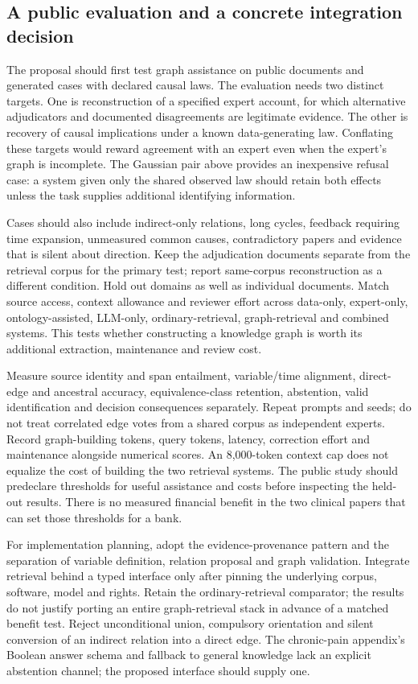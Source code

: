 \subsection{A public evaluation and a concrete integration decision}
\label{exec22:domain-validation}

The proposal should first test graph assistance on public documents and generated
cases with declared causal laws. The evaluation needs two distinct targets.
One is reconstruction of a specified expert account, for which alternative
adjudicators and documented disagreements are legitimate evidence. The other is
recovery of causal implications under a known data-generating law. Conflating
these targets would reward agreement with an expert even when the expert's graph
is incomplete. The Gaussian pair above provides an inexpensive refusal case:
a system given only the shared observed law should retain both effects unless
the task supplies additional identifying information.

Cases should also include indirect-only relations, long cycles, feedback requiring
time expansion, unmeasured common causes, contradictory papers and evidence that
is silent about direction. Keep the adjudication documents separate from the
retrieval corpus for the primary test; report same-corpus reconstruction as a
different condition. Hold out domains as well as individual documents. Match
source access, context allowance and reviewer effort across data-only,
expert-only, ontology-assisted, LLM-only, ordinary-retrieval, graph-retrieval and
combined systems. This tests whether constructing a knowledge graph is worth its
additional extraction, maintenance and review cost.

Measure source identity and span entailment, variable/time alignment, direct-edge
and ancestral accuracy, equivalence-class retention, abstention, valid
identification and decision consequences separately. Repeat prompts and seeds;
do not treat correlated edge votes from a shared corpus as independent experts.
Record graph-building tokens, query tokens, latency, correction effort and
maintenance alongside numerical scores. An 8,000-token context cap does not
equalize the cost of building the two retrieval systems. The public study should
predeclare thresholds for useful assistance and costs before inspecting the
held-out results. There is no measured financial benefit in the two clinical
papers that can set those thresholds for a bank.

For implementation planning, adopt the evidence-provenance pattern and the
separation of variable definition, relation proposal and graph validation.
Integrate retrieval behind a typed interface only after pinning the underlying
corpus, software, model and rights. Retain the ordinary-retrieval comparator;
the results do not justify porting an entire graph-retrieval stack in advance
of a matched benefit test. Reject unconditional union, compulsory orientation
and silent conversion of an indirect relation into a direct edge. The chronic-pain
appendix's Boolean answer schema and fallback to general knowledge lack an
explicit abstention channel; the proposed interface should supply one.
\cite{exec22_domain_lin}

